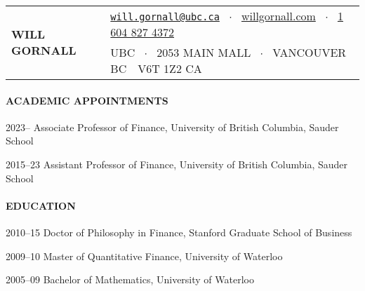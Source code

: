 \documentclass[11pt]{article}
\begin{document}
\begin{tabular}{@{}l@{\quad\quad}l}
\multirow{2}{*}{\huge\textbf{WILL GORNALL}} & 
\href{mailto:will.gornall@sauder.ubc.ca}{\nolinkurl{will.gornall@ubc.ca}} \ $\cdot$ \
\href{https://willgornall.com}{willgornall.com} \ $\cdot$ \ 
\href{tel:1 604 827 4372}{1 604 827 4372} 
\\
&  
UBC \ $\cdot$ \
2053 MAIN MALL \ $\cdot$ \ 
VANCOUVER BC\ \ V6T 1Z2 CA
\end{tabular}


\paragraph{ACADEMIC APPOINTMENTS}
\begin{datelist}
    \item[2023--] Associate Professor of Finance, University of British Columbia, Sauder School
    \item[2015--23] Assistant Professor of Finance, University of British Columbia, Sauder School
\end{datelist}

\paragraph{EDUCATION}
\begin{datelist}
    \item[2010--15] Doctor of Philosophy in Finance, Stanford Graduate School of Business
    \item[2009--10] Master of Quantitative Finance, University of Waterloo
    \item[2005--09] Bachelor of Mathematics, University of Waterloo
\end{datelist}
\end{document}
